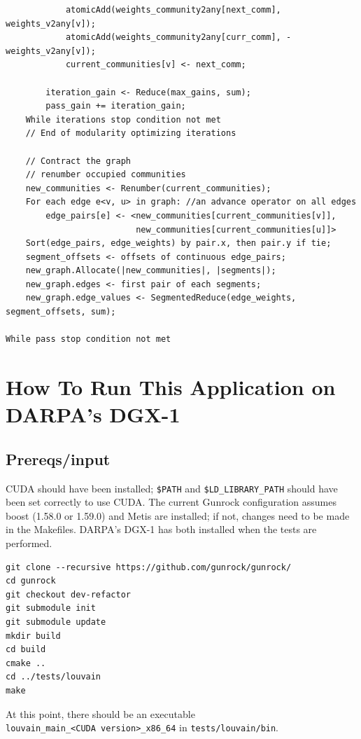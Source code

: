 \documentclass[10pt,article,oneside]{memoir}
\begin{document}
\begin{verbatim}
            atomicAdd(weights_community2any[next_comm],  weights_v2any[v]);
            atomicAdd(weights_community2any[curr_comm], -weights_v2any[v]);
            current_communities[v] <- next_comm;

        iteration_gain <- Reduce(max_gains, sum);
        pass_gain += iteration_gain;
    While iterations stop condition not met
    // End of modularity optimizing iterations

    // Contract the graph
    // renumber occupied communities
    new_communities <- Renumber(current_communities);
    For each edge e<v, u> in graph: //an advance operator on all edges
        edge_pairs[e] <- <new_communities[current_communities[v]],
                          new_communities[current_communities[u]]>
    Sort(edge_pairs, edge_weights) by pair.x, then pair.y if tie;
    segment_offsets <- offsets of continuous edge_pairs;
    new_graph.Allocate(|new_communities|, |segments|);
    new_graph.edges <- first pair of each segments;
    new_graph.edge_values <- SegmentedReduce(edge_weights, segment_offsets, sum);

While pass stop condition not met
\end{verbatim}

\section{How To Run This Application on DARPA's
DGX-1}\label{how-to-run-this-application-on-darpas-dgx-1-1}

\subsection{Prereqs/input}\label{prereqsinput}

CUDA should have been installed; \texttt{\$PATH} and
\texttt{\$LD\_LIBRARY\_PATH} should have been set correctly to use CUDA.
The current Gunrock configuration assumes boost (1.58.0 or 1.59.0) and
Metis are installed; if not, changes need to be made in the Makefiles.
DARPA's DGX-1 has both installed when the tests are performed.

\begin{verbatim}
git clone --recursive https://github.com/gunrock/gunrock/
cd gunrock
git checkout dev-refactor
git submodule init
git submodule update
mkdir build
cd build
cmake ..
cd ../tests/louvain
make
\end{verbatim}

At this point, there should be an executable
\texttt{louvain\_main\_\textless{}CUDA\ version\textgreater{}\_x86\_64}
in \texttt{tests/louvain/bin}.
\end{document}
